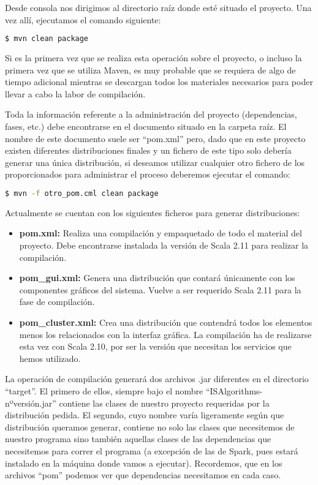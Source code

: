 Desde consola nos dirigimos al directorio raíz donde esté situado el proyecto. Una vez allí, ejecutamos el comando siguiente:

\begin{lstlisting}[language=bash]
$ mvn clean package
\end{lstlisting}

Si es la primera vez que se realiza esta operación sobre el proyecto, o incluso la primera vez que se utiliza Maven, es muy probable que se requiera de algo de tiempo adicional mientras se descargan todos los materiales necesarios para poder llevar a cabo la labor de compilación.

Toda la información referente a la administración del proyecto (dependencias, fases, etc.) debe encontrarse en el documento situado en la carpeta raíz. El nombre de este documento suele ser ``pom.xml'' pero, dado que en este proyecto existen diferentes distribuciones finales y un fichero de este tipo solo debería generar una única distribución, si deseamos utilizar cualquier otro fichero de los proporcionados para administrar el proceso deberemos ejecutar el comando:

\begin{lstlisting}[language=bash]
$ mvn -f otro_pom.cml clean package
\end{lstlisting}

Actualmente se cuentan con los siguientes ficheros para generar distribuciones:
\begin{itemize}
\item \textbf{pom.xml:} Realiza una compilación y empaquetado de todo el material del proyecto. Debe encontrarse instalada la versión de Scala 2.11 para realizar la compilación.
\item \textbf{pom\_gui.xml:} Genera una distribución que contará únicamente con los componentes gráficos del sistema. Vuelve a ser requerido Scala 2.11 para la fase de compilación.
\item \textbf{pom\_cluster.xml:} Crea una distribución que contendrá todos los elementos menos los relacionados con la interfaz gráfica. La compilación ha de realizarse esta vez con Scala 2.10, por ser la versión que necesitan los servicios que hemos utilizado.
\end{itemize}

La operación de compilación generará dos archivos .jar diferentes en el directorio ``target''. El primero de ellos, siempre bajo el nombre ``ISAlgorithms-nºversión.jar'' contiene las clases de nuestro proyecto requeridas por la distribución pedida. El segundo, cuyo nombre varía ligeramente según que distribución queramos generar, contiene no solo las clases que necesitemos de nuestro programa sino también aquellas clases de las dependencias que necesitemos para correr el programa (a excepción de las de Spark, pues estará instalado en la máquina donde vamos a ejecutar). Recordemos, que en los archivos ``pom'' podemos ver que dependencias necesitamos en cada caso.

